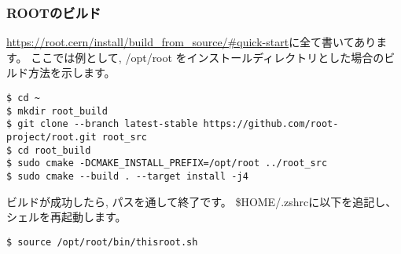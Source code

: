 \subsubsection{ROOTのビルド}
\url{https://root.cern/install/build_from_source/#quick-start}に全て書いてあります。
ここでは例として, /opt/root をインストールディレクトリとした場合のビルド方法を示します。
\begin{lstlisting}
$ cd ~
$ mkdir root_build
$ git clone --branch latest-stable https://github.com/root-project/root.git root_src
$ cd root_build
$ sudo cmake -DCMAKE_INSTALL_PREFIX=/opt/root ../root_src
$ sudo cmake --build . --target install -j4
\end{lstlisting}
ビルドが成功したら, パスを通して終了です。
\$HOME/.zshrcに以下を追記し、シェルを再起動します。
\begin{lstlisting}
$ source /opt/root/bin/thisroot.sh
\end{lstlisting}
